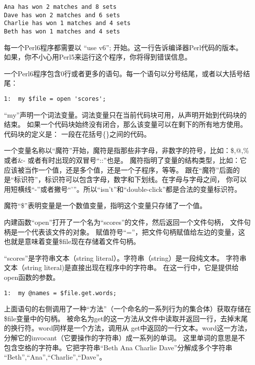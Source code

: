 \documentclass{ctexart}
\begin{document}
\begin{lstlisting}
Ana has won 2 matches and 8 sets
Dave has won 2 matches and 6 sets
Charlie has won 1 matches and 4 sets
Beth has won 1 matches and 4 sets
\end{lstlisting}
每一个Perl6程序都需要以 “use v6”; 开始。这一行告诉编译器Perl代码的版本。
如果，你不小心用Perl5来运行这个程序，你将得到错误信息。

一个Perl6程序包含0行或者更多的语句。每一个语句以分号结尾，或者以大括号结尾：

\begin{lstlisting}
1:  my $file = open 'scores';
\end{lstlisting}
``my''声明一个词法变量。词法变量只在当前代码块可用，从声明开始到代码块的结束。
如果一个代码块始终没有闭合，那么该变量可以在剩下的所有地方使用。代码块的定义是：
一段在花括号\{\}之间的代码。

一个变量名称以“魔符”开始，魔符是指那些非字母，非数字的符号，比如：\$,@,\% 或者\&-
或者有时出现的双冒号“::”也是。
魔符指明了变量的结构类型，比如：它应该被当作一个值，还是多个值，还是一个子程序，等等。
跟在“魔符”后面的是“标识符”，标识符可以包含字母，数字和下划线。在字母与字母之间，
你可以用短横线“-”或者撇号“'”。所以“isn't”和“double-click”都是合法的变量标识符。

魔符“\$”表明变量是一个数值变量，指明这个变量只存储了一个值。

内建函数“open”打开了一个名为“scores”的文件，然后返回一个文件句柄，
文件句柄是一个代表该文件的对象。
赋值符号“=”，把文件句柄赋值给左边的变量，这也就是意味着变量\$file现在存储着文件句柄。

“scores”是字符串文本（string literal）。字符串（string）是一段纯文本。
字符串文本（string literal)是直接出现在程序中的字符串。
在这一行中，它是提供给open函数的参数。


\begin{lstlisting}
1:  my @names = $file.get.words;
\end{lstlisting}
上面语句的右侧调用了一种“方法”（一个命名的一系列行为的集合体）获取存储在\$file变量中的句柄。
被命名为get的这一方法从文件中读取并返回一行，去掉末尾的换行符。word同样是一个方法，调用从
get中返回的一行文本。word这一方法，分解它的invocant（它要操作的字符串）成一系列的单词。
这里单词的意思是不包含空格的字符串。它把字符串“Beth Ana Charlie Dave”分解成多个字符串
“Beth”,“Ana”,“Charlie”,“Dave”。
\end{document}
